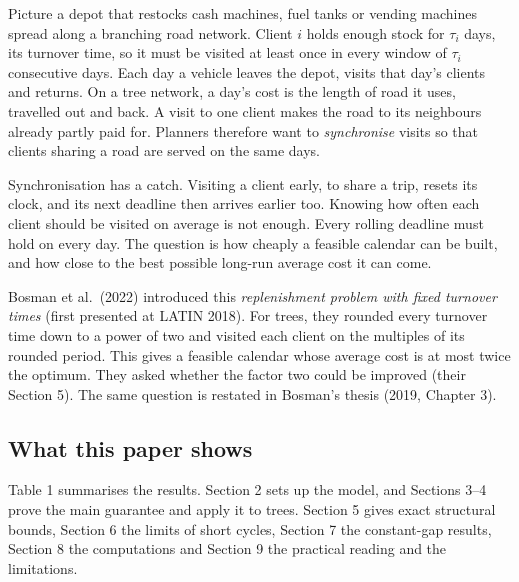 \documentclass[
  british,
  11pt,
  a4paper,
]{article}
\begin{document}
Picture a depot that restocks cash machines, fuel tanks or vending
machines spread along a branching road network. Client \(i\) holds
enough stock for \(\tau_i\) days, its turnover time, so it must be
visited at least once in every window of \(\tau_i\) consecutive days.
Each day a vehicle leaves the depot, visits that day's clients and
returns. On a tree network, a day's cost is the length of road it uses,
travelled out and back. A visit to one client makes the road to its
neighbours already partly paid for. Planners therefore want to
\emph{synchronise} visits so that clients sharing a road are served on
the same days.

Synchronisation has a catch. Visiting a client early, to share a trip,
resets its clock, and its next deadline then arrives earlier too.
Knowing how often each client should be visited on average is not
enough. Every rolling deadline must hold on every day. The question is
how cheaply a feasible calendar can be built, and how close to the best
possible long-run average cost it can come.

Bosman et al.~(2022) introduced this \emph{replenishment problem with
fixed turnover times} (first presented at LATIN 2018). For trees, they
rounded every turnover time down to a power of two and visited each
client on the multiples of its rounded period. This gives a feasible
calendar whose average cost is at most twice the optimum. They asked
whether the factor two could be improved (their Section 5). The same
question is restated in Bosman's thesis (2019, Chapter 3).

\subsection{What this paper shows}\label{what-this-paper-shows}

Table 1 summarises the results. Section 2 sets up the model, and
Sections 3--4 prove the main guarantee and apply it to trees. Section 5
gives exact structural bounds, Section 6 the limits of short cycles,
Section 7 the constant-gap results, Section 8 the computations and
Section 9 the practical reading and the limitations.

\end{document}
